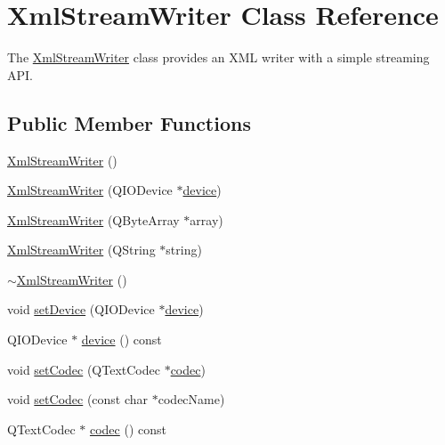 \hypertarget{class_xml_stream_writer}{}\section{Xml\+Stream\+Writer Class Reference}
\label{class_xml_stream_writer}


The \hyperlink{class_xml_stream_writer}{Xml\+Stream\+Writer} class provides an X\+ML writer with a simple streaming A\+PI.  


\subsection*{Public Member Functions}
\begin{DoxyCompactItemize}
\item 
\hyperlink{class_xml_stream_writer_acaffb798a42742e6be689bc0cf9b80d9}{Xml\+Stream\+Writer} ()
\item 
\hyperlink{class_xml_stream_writer_adad3a38281bd2eee59f7240098fb0c96}{Xml\+Stream\+Writer} (Q\+I\+O\+Device $\ast$\hyperlink{class_xml_stream_writer_a306a738e0aad39898ee318c7b7c8bc3c}{device})
\item 
\hyperlink{class_xml_stream_writer_a59044bd63fb4f1bf1c615666a44ea325}{Xml\+Stream\+Writer} (Q\+Byte\+Array $\ast$array)
\item 
\hyperlink{class_xml_stream_writer_a149da545bb2fa21dbb6989c0eab6cf99}{Xml\+Stream\+Writer} (Q\+String $\ast$string)
\item 
\hyperlink{class_xml_stream_writer_a0cd28f6b6ce9ad95831b35d6823a8ecb}{$\sim$\+Xml\+Stream\+Writer} ()
\item 
void \hyperlink{class_xml_stream_writer_ac03d4a48cc662d5c43a136560f514fd3}{set\+Device} (Q\+I\+O\+Device $\ast$\hyperlink{class_xml_stream_writer_a306a738e0aad39898ee318c7b7c8bc3c}{device})
\item 
Q\+I\+O\+Device $\ast$ \hyperlink{class_xml_stream_writer_a306a738e0aad39898ee318c7b7c8bc3c}{device} () const
\item 
void \hyperlink{class_xml_stream_writer_ab73a5ee5db6824afd4a2bc66e8f12e78}{set\+Codec} (Q\+Text\+Codec $\ast$\hyperlink{class_xml_stream_writer_a08d4e9eddc07ed3682ced34cce8861f9}{codec})
\item 
void \hyperlink{class_xml_stream_writer_a926ebebdb26125f7423cf579bf07143a}{set\+Codec} (const char $\ast$codec\+Name)
\item 
Q\+Text\+Codec $\ast$ \hyperlink{class_xml_stream_writer_a08d4e9eddc07ed3682ced34cce8861f9}{codec} () const

\end{DoxyCompactItemize}
